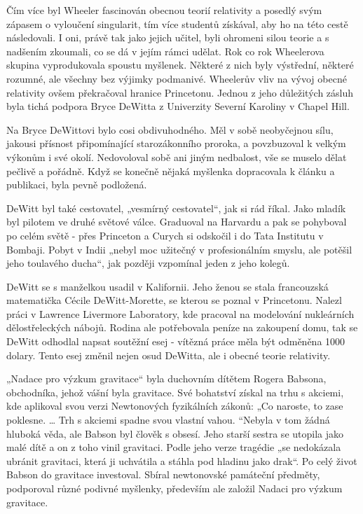   Čím více byl Wheeler fascinován obecnou teorií relativity a posedlý svým zápasem o vyloučení
  singularit, tím více studentů získával, aby ho na této cestě následovali. I oni, právě tak jako
  jejich učitel, byli ohromeni silou teorie a s nadšením zkoumali, co se dá v jejím rámci udělat.
  Rok co rok Wheelerova skupina vyprodukovala spoustu myšlenek. Některé z nich byly výstřední,
  některé rozumné, ale všechny bez výjimky podmanivé. Wheelerův vliv na vývoj obecné relativity
  ovšem překračoval hranice Princetonu. Jednou z jeho důležitých zásluh byla tichá podpora Bryce
  DeWitta z Univerzity Severní Karoliny v Chapel Hill. 

  Na Bryce DeWittovi bylo cosi obdivuhodného. Měl v sobě neobyčejnou sílu, jakousi přísnost
  připomínající starozákonního proroka, a povzbuzoval k velkým výkonům i své okolí. Nedovoloval sobě
  ani jiným nedbalost, vše se muselo dělat pečlivě a pořádně. Když se konečně nějaká myšlenka
  dopracovala k článku a publikaci, byla pevně podložená. 

  DeWitt byl také cestovatel, „vesmírný cestovatel“, jak si rád říkal. Jako mladík byl pilotem ve
  druhé světové válce. Graduoval na Harvardu a pak se pohyboval po celém světě - přes Princeton a
  Curych si odskočil i do Tata Institutu v Bombaji. Pobyt v Indii „nebyl moc užitečný v
  profesionálním smyslu, ale potěšil jeho toulavého ducha“, jak později vzpomínal jeden z jeho
  kolegů. 

  DeWitt se s manželkou usadil v Kalifornii. Jeho ženou se stala francouzská matematička Cécile
  DeWitt-Morette, se kterou se poznal v Princetonu. Nalezl práci v Lawrence Livermore Laboratory,
  kde pracoval na modelování nukleárních dělostřeleckých nábojů. Rodina ale potřebovala peníze na
  zakoupení domu, tak se DeWitt odhodlal napsat soutěžní esej - vítězná práce měla být odměněna 1000
  dolary. Tento esej změnil nejen osud DeWitta, ale i obecné teorie relativity.

  „Nadace pro výzkum gravitace“ byla duchovním dítětem Rogera Babsona, obchodníka, jehož vášní byla
  gravitace. Své bohatství získal na trhu s akciemi, kde aplikoval svou verzi Newtonových
  fyzikálních zákonů: „Co naroste, to zase poklesne. … Trh s akciemi spadne svou vlastní vahou.
  “Nebyla v tom žádná hluboká věda, ale Babson byl člověk s obsesí. Jeho starší sestra se utopila
  jako malé dítě a on z toho vinil gravitaci. Podle jeho verze tragédie „se nedokázala ubránit
  gravitaci, která ji uchvátila a stáhla pod hladinu jako drak“. Po celý život Babson do gravitace
  investoval. Sbíral newtonovské památeční předměty, podporoval různé podivné myšlenky, především
  ale založil Nadaci pro výzkum gravitace. 

